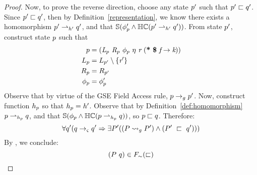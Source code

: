 \begin{proof}
Now, to prove the reverse direction, choose any state $p^\prime$ such that $p^\prime \sqsubset q^\prime$. Since $p^\prime \sqsubset q^\prime$, then by Definition~\ref{representation}, we know there exists a homomorphism $p^\prime \rightharpoonup_{h^\prime} q^\prime$, and that $\mathbb{S}( \phi_{p}^\prime \wedge \mathbb{HC}(p^\prime \rightharpoonup_{h^\prime} q^\prime) )$. From state $p^\prime$, construct state $p$ such that 
\begin{align*}
\gsest &= \lp \cfgnt{L}_\gsest\ \cfgnt{R}_\gsest\ \phi_\gsest\ \eta\ \cfgnt{r}\ \lp \cfgt{*}\ \cfgt{\$}\ \cfgnt{f} \rightarrow \cfgnt{k}\rp \rp\\
L_\gsest &= L_{\gsest^\prime} \setminus \{\cfgnt{r}^\prime \}\\
R_\gsest &= R_{\gsest^\prime}\\
\phi_\gsest &= \phi_\gsest^\prime
\end{align*}
Observe that by virtue of the GSE Field Access rule, $p \rightarrow_{g} p^\prime$. Now, construct function $h_{p}$ so that $h_{p} = h^\prime$. Observe that by Definition~\ref{def:homomorphism} $p \rightharpoonup_{h_{p}} q$,  and that $\mathbb{S}( \phi_{p} \wedge \mathbb{HC}(p \rightharpoonup_{h_{p}} q) )$, so $p \sqsubset q$. Therefore:
\begin{equation}
\forall q^\prime ( q \rightarrow_{\varsigma} q^\prime\Rightarrow \exists P^\prime( (P \leadsto_{g} P^\prime )\wedge (P^\prime\ \sqsubset\ q^\prime ))  )
\end{equation}
By , we conclude:
$$(P \ q) \in F_\sim(\sqsubset)$$
\end{proof}


